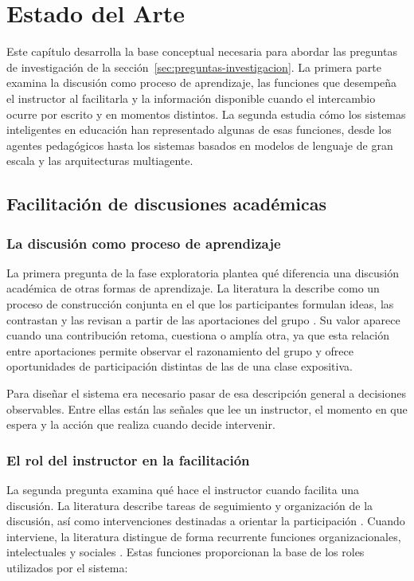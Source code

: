 \chapter{Estado del Arte}
\label{chap:estado-arte}

Este capítulo desarrolla la base conceptual necesaria para abordar las preguntas de investigación de la sección~\ref{sec:preguntas-investigacion}. La primera parte examina la discusión como proceso de aprendizaje, las funciones que desempeña el instructor al facilitarla y la información disponible cuando el intercambio ocurre por escrito y en momentos distintos. La segunda estudia cómo los sistemas inteligentes en educación han representado algunas de esas funciones, desde los agentes pedagógicos hasta los sistemas basados en modelos de lenguaje de gran escala y las arquitecturas multiagente.

\section{Facilitación de discusiones académicas}

\subsection{La discusión como proceso de aprendizaje}

La primera pregunta de la fase exploratoria plantea qué diferencia una discusión académica de otras formas de aprendizaje. La literatura la describe como un proceso de construcción conjunta en el que los participantes formulan ideas, las contrastan y las revisan a partir de las aportaciones del grupo \parencite{Murphy2018,Mercer2000,Glina2012}. Su valor aparece cuando una contribución retoma, cuestiona o amplía otra, ya que esta relación entre aportaciones permite observar el razonamiento del grupo y ofrece oportunidades de participación distintas de las de una clase expositiva.

Para diseñar el sistema era necesario pasar de esa descripción general a decisiones observables. Entre ellas están las señales que lee un instructor, el momento en que espera y la acción que realiza cuando decide intervenir.

\subsection{El rol del instructor en la facilitación}

La segunda pregunta examina qué hace el instructor cuando facilita una discusión. La literatura describe tareas de seguimiento y organización de la discusión, así como intervenciones destinadas a orientar la participación \parencite{Abdous2011,Rovai2007}. Cuando interviene, la literatura distingue de forma recurrente funciones organizacionales, intelectuales y sociales \parencite{Paulsen1995,Abdous2011}. Estas funciones proporcionan la base de los roles utilizados por el sistema:

